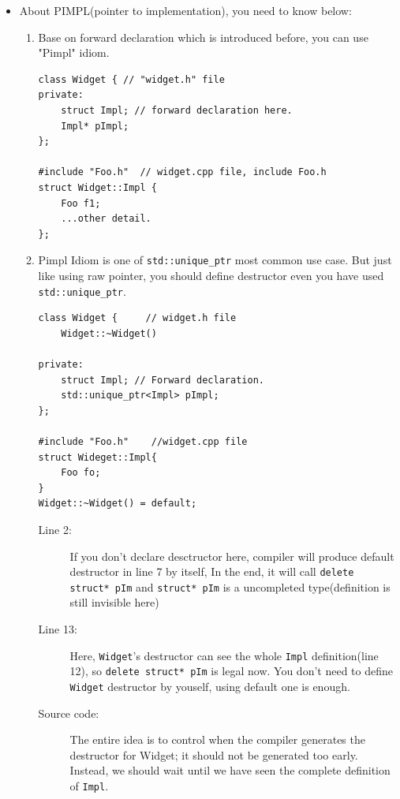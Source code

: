 \documentclass[a4paper,11pt,twoside]{book}
\begin{document}
\begin{itemize}
	\item About PIMPL(pointer to implementation), you need to know below:
	\begin{enumerate}
		\item Base on forward declaration which is introduced before, you can use "Pimpl" idiom.
\begin{lstlisting}[numbers=none]
class Widget { // "widget.h" file
private:
	struct Impl; // forward declaration here.
	Impl* pImpl;
};
		
#include "Foo.h"  // widget.cpp file, include Foo.h
struct Widget::Impl {
	Foo f1;
	...other detail.
};
\end{lstlisting}
		
		\item Pimpl Idiom is one of \texttt{std::unique\_ptr} most common use case. But just like using raw pointer,  you should define destructor even you have used \texttt{std::unique\_ptr}. 
		
\begin{lstlisting}
class Widget {     // widget.h file
	Widget::~Widget()
	
private:
	struct Impl; // Forward declaration.
	std::unique_ptr<Impl> pImpl;
};
		
#include "Foo.h"    //widget.cpp file
struct Wideget::Impl{
	Foo fo; 
}
Widget::~Widget() = default; 
\end{lstlisting}
\begin{description}
	\item[Line 2:] If you don't declare desctructor here, compiler will produce default destructor in line 7 by itself, In the end, it will call \texttt{delete struct* pIm} and \texttt{struct* pIm} is a uncompleted type(definition is still invisible here)
	
	\item[Line 13:] Here, \texttt{Widget}'s destructor can see the whole \texttt{Impl} definition(line 12), so \texttt{delete struct* pIm} is legal now. You don't need to define \texttt{Widget} destructor by youself, using default one is enough.
	
	\item[Source code:] The entire idea is to control when the compiler generates the destructor for Widget; it should not be generated too early. Instead, we should wait until we have seen the complete definition of \texttt{Impl}.
\end{description}

\end{enumerate}
\end{itemize}
\end{document}
